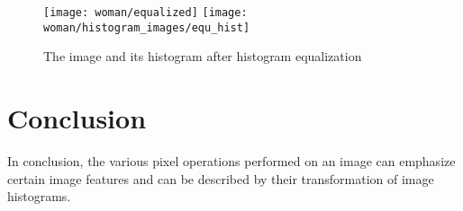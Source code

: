 \documentclass[12pt,letterpaper]{article}
\begin{document}
\begin{figure}[ht]
\centering
\texttt{[image: woman/equalized]} \hspace{0.5cm} \texttt{[image: woman/histogram\_images/equ\_hist]}
\caption{\small{The image and its histogram after histogram equalization}
\label{fig:equ} }
\end{figure}

\clearpage 
 
\section{Conclusion}
In conclusion, the various pixel operations performed on an image can emphasize certain image features and can be described by their transformation of image histograms.
\end{document}
